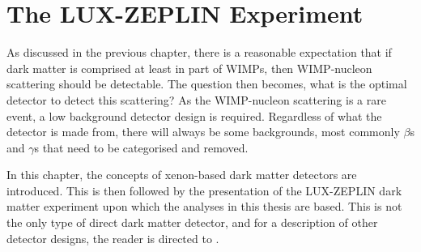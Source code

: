 \chapter{The LUX-ZEPLIN Experiment}
\label{sec:lz_detector_chapter}
\par
As discussed in the previous chapter, there is a reasonable expectation that if dark matter is comprised at least in part of WIMPs, then WIMP-nucleon scattering should be detectable.
The question then becomes, what is the optimal detector to detect this scattering?
As the WIMP-nucleon scattering is a rare event, a low background detector design is required.
Regardless of what the detector is made from, there will always be some backgrounds, most commonly $\beta$s and $\gamma$s that need to be categorised and removed.
\par
In this chapter, the concepts of xenon-based dark matter detectors are introduced.
This is then followed by the presentation of the LUX-ZEPLIN dark matter experiment upon which the analyses in this thesis are based.
This is not the only type of direct dark matter detector, and for a description of other detector designs, the reader is directed to \cite{direct_detector_designs_ref}.



\clearpage


%